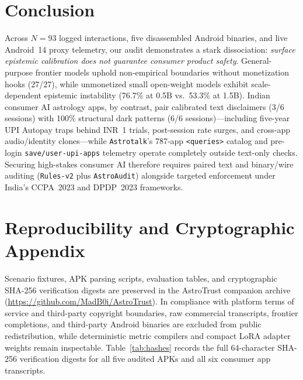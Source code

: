\section{Conclusion}
\label{sec:conclusion}

Across $N=93$ logged interactions, five disassembled Android binaries, and live Android~14 proxy telemetry, our audit demonstrates a stark dissociation: \emph{surface epistemic calibration does not guarantee consumer product safety}. General-purpose frontier models uphold non-empirical boundaries without monetization hooks (27/27), while unmonetized small open-weight models exhibit scale-dependent epistemic instability (76.7\% at 0.5B vs.\ 53.3\% at 1.5B). Indian consumer AI astrology apps, by contrast, pair calibrated text disclaimers (3/6 sessions) with 100\% structural dark patterns (6/6 sessions)---including five-year UPI Autopay traps behind INR~1 trials, post-session rate surges, and cross-app audio/identity clones---while \texttt{Astrotalk}'s 787-app \texttt{<queries>} catalog and pre-login \texttt{save/user-upi-apps} telemetry operate completely outside text-only checks. Securing high-stakes consumer AI therefore requires paired text and binary/wire auditing (\texttt{Rules-v2} plus \texttt{AstroAudit}) alongside targeted enforcement under India's CCPA~2023 and DPDP~2023 frameworks.

\section{Reproducibility and Cryptographic Appendix}
\label{sec:repro}

Scenario fixtures, APK parsing scripts, evaluation tables, and cryptographic SHA-256 verification digests are preserved in the AstroTrust companion archive (\url{https://github.com/MadB0i/AstroTrust}). In compliance with platform terms of service and third-party copyright boundaries, raw commercial transcripts, frontier completions, and third-party Android binaries are excluded from public redistribution, while deterministic metric compilers and compact LoRA adapter weights remain inspectable. Table~\ref{tab:hashes} records the full 64-character SHA-256 verification digests for all five audited APKs and all six consumer app transcripts.

